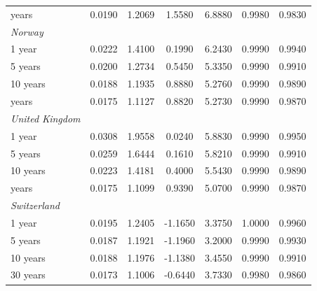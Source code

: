 \documentclass{article}
\begin{document}
\begin{table}[H]
\begin{tabular}{l c c c c c c}
\medskip													
30 years	&	0.0190	&	1.2069	&	1.5580	&	6.8880	&	0.9980	&	0.9830	\\
\textit{Norway}	&		&		&		&		&		&		\\
1 year	&	0.0222	&	1.4100	&	0.1990	&	6.2430	&	0.9990	&	0.9940	\\
5 years	&	0.0200	&	1.2734	&	0.5450	&	5.3350	&	0.9990	&	0.9910	\\
10 years	&	0.0188	&	1.1935	&	0.8880	&	5.2760	&	0.9990	&	0.9890	\\
\medskip													
30 years	&	0.0175	&	1.1127	&	0.8820	&	5.2730	&	0.9990	&	0.9870	\\
\textit{United Kingdom}	&		&		&		&		&		&		\\
1 year	&	0.0308	&	1.9558	&	0.0240	&	5.8830	&	0.9990	&	0.9950	\\
5 years	&	0.0259	&	1.6444	&	0.1610	&	5.8210	&	0.9990	&	0.9910	\\
10 years	&	0.0223	&	1.4181	&	0.4000	&	5.5430	&	0.9990	&	0.9890	\\
\medskip													
30 years	&	0.0175	&	1.1099	&	0.9390	&	5.0700	&	0.9990	&	0.9870	\\
\textit{Switzerland}	&		&		&		&		&		&		\\
1 year	&	0.0195	&	1.2405	&	-1.1650	&	3.3750	&	1.0000	&	0.9960	\\
5 years	&	0.0187	&	1.1921	&	-1.1960	&	3.2000	&	0.9990	&	0.9930	\\
10 years	&	0.0188	&	1.1976	&	-1.1380	&	3.4550	&	0.9990	&	0.9910	\\
30 years	&	0.0173	&	1.1006	&	-0.6440	&	3.7330	&	0.9980	&	0.9860	\\

\hline%
\end{tabular}
\label{table:nonlin}%
\end{table}
\end{document}

